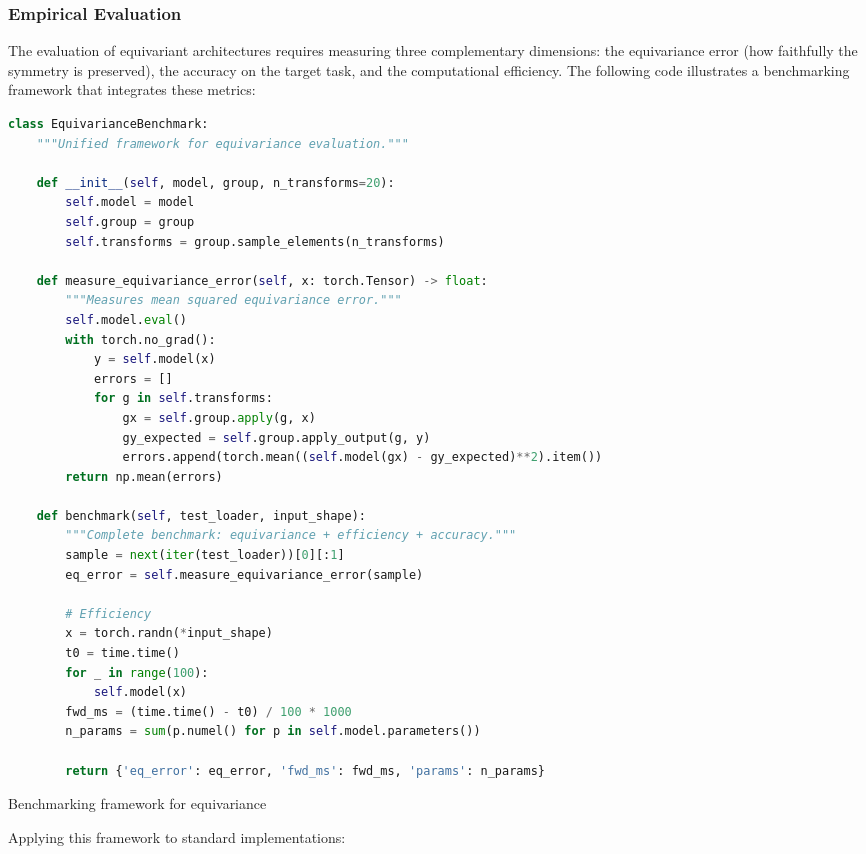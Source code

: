 \subsubsection{Empirical Evaluation}\label{subsubsec:framework_evaluacion_empirica}

The evaluation of equivariant architectures requires measuring three complementary dimensions: the equivariance error (how faithfully the symmetry is preserved), the accuracy on the target task, and the computational efficiency. The following code illustrates a benchmarking framework that integrates these metrics:

\begin{listing}[h]
\begin{lstlisting}[language=Python]
class EquivarianceBenchmark:
    """Unified framework for equivariance evaluation."""

    def __init__(self, model, group, n_transforms=20):
        self.model = model
        self.group = group
        self.transforms = group.sample_elements(n_transforms)

    def measure_equivariance_error(self, x: torch.Tensor) -> float:
        """Measures mean squared equivariance error."""
        self.model.eval()
        with torch.no_grad():
            y = self.model(x)
            errors = []
            for g in self.transforms:
                gx = self.group.apply(g, x)
                gy_expected = self.group.apply_output(g, y)
                errors.append(torch.mean((self.model(gx) - gy_expected)**2).item())
        return np.mean(errors)

    def benchmark(self, test_loader, input_shape):
        """Complete benchmark: equivariance + efficiency + accuracy."""
        sample = next(iter(test_loader))[0][:1]
        eq_error = self.measure_equivariance_error(sample)

        # Efficiency
        x = torch.randn(*input_shape)
        t0 = time.time()
        for _ in range(100):
            self.model(x)
        fwd_ms = (time.time() - t0) / 100 * 1000
        n_params = sum(p.numel() for p in self.model.parameters())

        return {'eq_error': eq_error, 'fwd_ms': fwd_ms, 'params': n_params}
\end{lstlisting}
\caption{Benchmarking framework for equivariance}
\label{code:equivariance_benchmark}
\end{listing}

Applying this framework to standard implementations:

